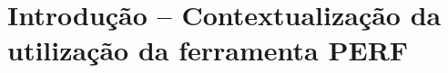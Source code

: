 \documentclass[conference,compsoc]{IEEEtran}
\begin{document}
  \maketitle







  \IEEEpeerreviewmaketitle






  \section{Introdução -- Contextualização da utilização da ferramenta PERF}  
\end{document}
